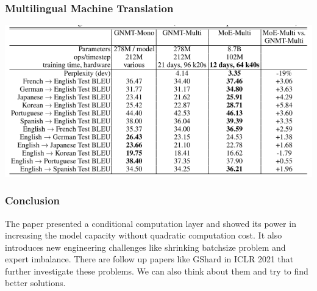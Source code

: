 \documentclass[12pt,aspectratio=169]{beamer}
\begin{document}

    \begin{frame}
        \frametitle{Multilingual Machine Translation}

        \centering
        \includegraphics[scale=0.45]{exp4.png}
    \end{frame}

    \appendix

    \begin{frame}
        \frametitle{Conclusion}

        The paper presented a conditional computation layer and showed its power in increasing the model capacity
        without quadratic computation cost. It also introduces new engineering challenges like shrinking batchsize
        problem and expert imbalance. There are follow up papers like GShard in ICLR 2021 that further investigate these
        problems. We can also think about them and try to find better solutions.
    \end{frame}

\end{document}

